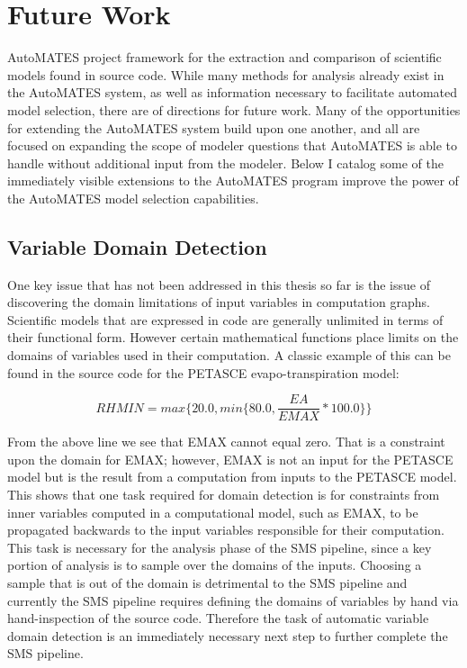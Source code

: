 \section{Future Work\label{sec:future_work}}
 AutoMATES project 
framework for the extraction and comparison of scientific models found in source code.
While many methods for analysis already exist in the AutoMATES system, as well as information necessary to facilitate automated model selection, there are  %
of directions for future work.
Many of the opportunities for extending the AutoMATES system build upon one another, and all are focused on expanding the scope of modeler questions that AutoMATES is able to handle without additional input from the modeler.
Below I catalog some of the immediately visible extensions to the AutoMATES program improve the power of the AutoMATES model selection capabilities.

\subsection{Variable Domain Detection\label{sec:var_domain_detection}}
One key issue that has not been addressed in this thesis so far is the issue of discovering the domain limitations of input variables in computation graphs.
Scientific models that are expressed in code are generally unlimited in terms of their functional form.
However certain mathematical functions place limits on the domains of variables used in their computation.
A classic example of this can be found in the source code for the PETASCE evapo-transpiration model:

\begin{equation}
  RHMIN = max\{20.0, min\{80.0, \frac{EA}{EMAX}*100.0\}\}
\end{equation}

From the above line we see that EMAX cannot equal zero.
That is a constraint upon the domain for EMAX; however, EMAX is not an input for the PETASCE model but is the result from a computation from inputs to the PETASCE model.
This shows that one task required for domain detection is for constraints from inner variables computed in a computational model, such as EMAX, to be propagated backwards to the input variables responsible for their computation.
This task is necessary for the analysis phase of the SMS pipeline, since a key portion of analysis is to sample over the domains of the inputs.
Choosing a sample that is out of the domain is detrimental to the SMS pipeline and currently the SMS pipeline requires defining the domains of variables by hand via hand-inspection of the source code.
Therefore the task of automatic variable domain detection is an immediately necessary next step to further complete the SMS pipeline.

